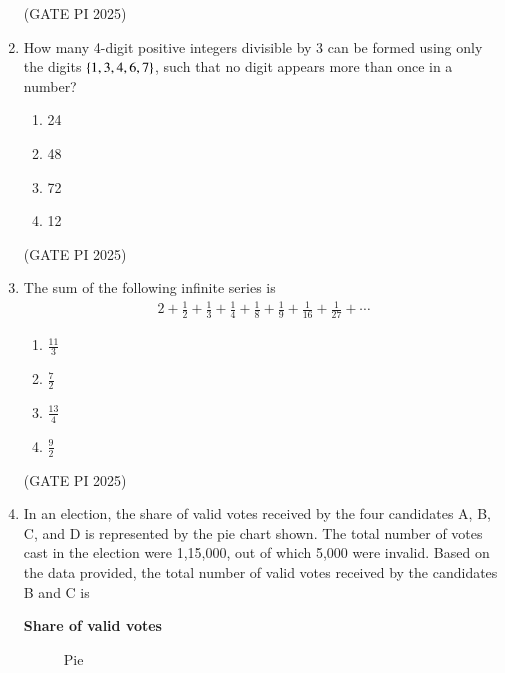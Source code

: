 \documentclass[journal,12pt,onecolumn]{IEEEtran}
\theoremstyle{remark}
\begin{document}
\begin{enumerate}
\hfill (GATE PI 2025)

\item How many 4-digit positive integers divisible by 3 can be formed using only the digits $\left\{1, 3, 4, 6, 7\right\}$, such that no digit appears more than once in a number?

\begin{multicols}{4}
\begin{enumerate}
    \item 24
    \item 48
    \item 72
    \item 12
\end{enumerate}
\end{multicols}

\hfill (GATE PI 2025)

\item The sum of the following infinite series is
\begin{align*}
2 + \frac{1}{2} + \frac{1}{3} + \frac{1}{4} + \frac{1}{8} + \frac{1}{9} + \frac{1}{16} + \frac{1}{27} + \cdots
\end{align*}

\begin{multicols}{4}
\begin{enumerate}
    \item $\frac{11}{3}$
    \item $\frac{7}{2}$
    \item $\frac{13}{4}$
    \item $\frac{9}{2}$
\end{enumerate}
\end{multicols}

\hfill (GATE PI 2025)

\item In an election, the share of valid votes received by the four candidates A, B, C, and D is represented by the pie chart shown. The total number of votes cast in the election were 1,15,000, out of which 5,000 were invalid.
Based on the data provided, the total number of valid votes received by the candidates B and C is \\

\begin{center}
\textbf{Share of valid votes}
\end{center}
\begin{figure}[H]
\centering
{}
\caption{Pie}
\end{figure}


\end{enumerate}
\end{document}
